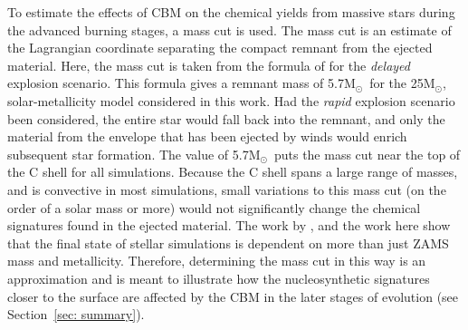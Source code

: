 \documentclass[useAMS,usenatbib]{mn2e}
\newcommand{\Msun}{\ensuremath{\mathrm{M}_\odot}}
\begin{document}
To estimate the effects of CBM on the chemical yields from massive stars during
the advanced burning stages, a mass cut is used. The mass cut is an estimate of 
the Lagrangian coordinate
separating the compact remnant from the ejected material. Here, the mass cut is
taken from the formula of \citet{Fryer2012} for the \emph{delayed} explosion
scenario. This formula gives a remnant mass of 5.7\Msun~for the 25\Msun,
solar-metallicity model considered in this work. Had the \emph{rapid} explosion
scenario been considered, the entire star would fall back into the remnant, and
only the material from the envelope that has been ejected by winds would enrich
subsequent star formation. The value of 5.7\Msun~puts the mass cut near the top
of the C shell for all simulations. Because the C shell spans a large range of
masses, and is convective in most simulations, small variations to this mass
cut (on the order of a solar mass or more) would not significantly change the
chemical signatures found in the ejected material. The work by \citet{Sukhbold2016,Farmer2016}, and the work here show that the final state of stellar simulations is dependent on more than just ZAMS mass and metallicity. Therefore, determining the mass cut in this way is an approximation and is meant to illustrate how the nucleosynthetic signatures closer to the surface are affected by the CBM in the later stages of evolution (see Section~\ref{sec: summary}). 
\end{document}

